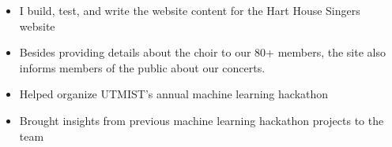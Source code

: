 \documentclass[10pt,a4paper,ragged2e]{altacv}
\begin{document}

\begin{fullwidth}
\makecvheader
\end{fullwidth}



\begin{itemize}
\item I build, test, and write the website content for the Hart House Singers website
\item Besides providing details about the choir to our 80+ members, the site also informs members of the public about our concerts.
\smallskip
\end{itemize}

\divider

\begin{itemize}
\item Helped organize UTMIST's annual machine learning hackathon
\item Brought insights from previous machine learning hackathon projects to the team
\end{itemize}
\end{document}
